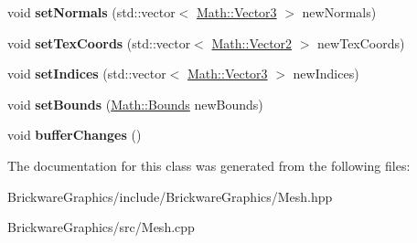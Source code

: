 \begin{DoxyCompactItemize}
\item 
\hypertarget{classBrickware_1_1Graphics_1_1Mesh_a874abda2bd1ebda52e8cd4ce9c39359d}{}void {\bfseries set\+Normals} (std\+::vector$<$ \hyperlink{classBrickware_1_1Math_1_1Vector3}{Math\+::\+Vector3} $>$ new\+Normals)\label{classBrickware_1_1Graphics_1_1Mesh_a874abda2bd1ebda52e8cd4ce9c39359d}

\item 
\hypertarget{classBrickware_1_1Graphics_1_1Mesh_a0d11042f182422db4c3b05f0fb6e2049}{}void {\bfseries set\+Tex\+Coords} (std\+::vector$<$ \hyperlink{classBrickware_1_1Math_1_1Vector2}{Math\+::\+Vector2} $>$ new\+Tex\+Coords)\label{classBrickware_1_1Graphics_1_1Mesh_a0d11042f182422db4c3b05f0fb6e2049}

\item 
\hypertarget{classBrickware_1_1Graphics_1_1Mesh_a9545f582770aa927e8bdcbcd4fd14e46}{}void {\bfseries set\+Indices} (std\+::vector$<$ \hyperlink{classBrickware_1_1Math_1_1Vector3}{Math\+::\+Vector3} $>$ new\+Indices)\label{classBrickware_1_1Graphics_1_1Mesh_a9545f582770aa927e8bdcbcd4fd14e46}

\item 
\hypertarget{classBrickware_1_1Graphics_1_1Mesh_a4461fd7dd78a5e3d1e21758470fca005}{}void {\bfseries set\+Bounds} (\hyperlink{classBrickware_1_1Math_1_1Bounds}{Math\+::\+Bounds} new\+Bounds)\label{classBrickware_1_1Graphics_1_1Mesh_a4461fd7dd78a5e3d1e21758470fca005}

\item 
\hypertarget{classBrickware_1_1Graphics_1_1Mesh_aa8fa76b9c2e0354abae85fbae082e89a}{}void {\bfseries buffer\+Changes} ()\label{classBrickware_1_1Graphics_1_1Mesh_aa8fa76b9c2e0354abae85fbae082e89a}

\end{DoxyCompactItemize}


The documentation for this class was generated from the following files\+:\begin{DoxyCompactItemize}
\item 
Brickware\+Graphics/include/\+Brickware\+Graphics/Mesh.\+hpp\item 
Brickware\+Graphics/src/Mesh.\+cpp\end{DoxyCompactItemize}
